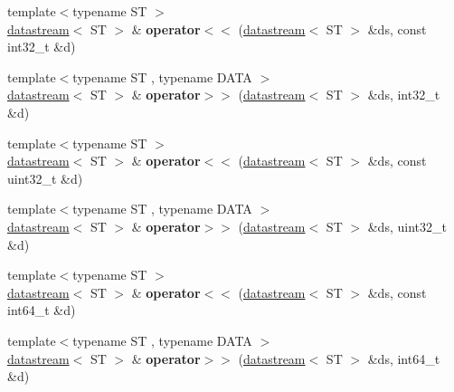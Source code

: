 \begin{DoxyCompactItemize}
\item 
\mbox{\label{namespacefc_aa2efa6043e93495437174d8672a788d8}} 
{\footnotesize template$<$typename ST $>$ }\\\mbox{\hyperlink{classfc_1_1datastream}{datastream}}$<$ ST $>$ \& {\bfseries operator$<$$<$} (\mbox{\hyperlink{classfc_1_1datastream}{datastream}}$<$ ST $>$ \&ds, const int32\+\_\+t \&d)
\item 
\mbox{\label{namespacefc_a7e64f836dfad344a767521dbe953e41f}} 
{\footnotesize template$<$typename ST , typename D\+A\+TA $>$ }\\\mbox{\hyperlink{classfc_1_1datastream}{datastream}}$<$ ST $>$ \& {\bfseries operator$>$$>$} (\mbox{\hyperlink{classfc_1_1datastream}{datastream}}$<$ ST $>$ \&ds, int32\+\_\+t \&d)
\item 
\mbox{\label{namespacefc_a771fb7f776e46cec31ceb21cba7d3497}} 
{\footnotesize template$<$typename ST $>$ }\\\mbox{\hyperlink{classfc_1_1datastream}{datastream}}$<$ ST $>$ \& {\bfseries operator$<$$<$} (\mbox{\hyperlink{classfc_1_1datastream}{datastream}}$<$ ST $>$ \&ds, const uint32\+\_\+t \&d)
\item 
\mbox{\label{namespacefc_a84e5aaa7e6df43d7138391367ddd3083}} 
{\footnotesize template$<$typename ST , typename D\+A\+TA $>$ }\\\mbox{\hyperlink{classfc_1_1datastream}{datastream}}$<$ ST $>$ \& {\bfseries operator$>$$>$} (\mbox{\hyperlink{classfc_1_1datastream}{datastream}}$<$ ST $>$ \&ds, uint32\+\_\+t \&d)
\item 
\mbox{\label{namespacefc_af7da63c0596f660b8f0073bf11a04eec}} 
{\footnotesize template$<$typename ST $>$ }\\\mbox{\hyperlink{classfc_1_1datastream}{datastream}}$<$ ST $>$ \& {\bfseries operator$<$$<$} (\mbox{\hyperlink{classfc_1_1datastream}{datastream}}$<$ ST $>$ \&ds, const int64\+\_\+t \&d)
\item 
\mbox{\label{namespacefc_a723554a53399c27da57711af0d7e6cd8}} 
{\footnotesize template$<$typename ST , typename D\+A\+TA $>$ }\\\mbox{\hyperlink{classfc_1_1datastream}{datastream}}$<$ ST $>$ \& {\bfseries operator$>$$>$} (\mbox{\hyperlink{classfc_1_1datastream}{datastream}}$<$ ST $>$ \&ds, int64\+\_\+t \&d)

\end{DoxyCompactItemize}

